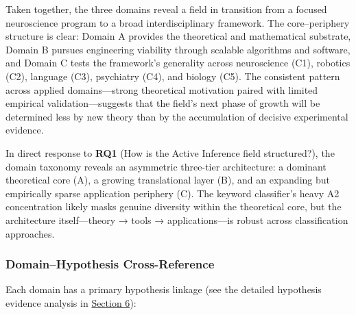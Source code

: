 \documentclass[
]{article}
\begin{document}
Taken together, the three domains reveal a field in transition from a
focused neuroscience program to a broad interdisciplinary framework. The
core--periphery structure is clear: Domain A provides the theoretical
and mathematical substrate, Domain B pursues engineering viability
through scalable algorithms and software, and Domain C tests the
framework's generality across neuroscience (C1), robotics (C2), language
(C3), psychiatry (C4), and biology (C5). The consistent pattern across
applied domains---strong theoretical motivation paired with limited
empirical validation---suggests that the field's next phase of growth
will be determined less by new theory than by the accumulation of
decisive experimental evidence.

In direct response to \textbf{RQ1} (How is the Active Inference field
structured?), the domain taxonomy reveals an asymmetric three-tier
architecture: a dominant theoretical core (A), a growing translational
layer (B), and an expanding but empirically sparse application periphery
(C). The keyword classifier's heavy A2 concentration likely masks
genuine diversity within the theoretical core, but the architecture
itself---theory → tools → applications---is robust across classification
approaches.

\subsubsection{Domain--Hypothesis
Cross-Reference}\label{domainhypothesis-cross-reference}

Each domain has a primary hypothesis linkage (see the detailed
hypothesis evidence analysis in
\hyperref[sec:hypothesis_results]{Section 6}):
\end{document}
